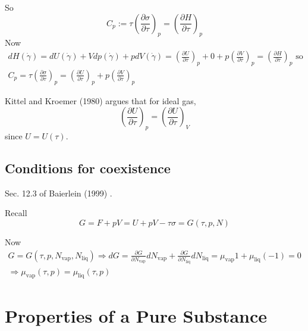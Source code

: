\documentclass[10pt]{amsart}
\begin{document}
\begin{multicols*}{2}
So 
\[
C_p := \tau \left( \frac{ \partial \sigma }{ \partial \tau } \right)_p = \left( \frac{ \partial H}{ \partial \tau} \right)_p
\]
Now 
\[
\begin{gathered}
  dH(\dot{\gamma}) = dU(\dot{\gamma}) + Vdp(\dot{\gamma} ) + pdV(\dot{\gamma}) = \left( \frac{ \partial U }{ \partial \tau} \right)_p + 0 + p \left( \frac{ \partial V}{ \partial \tau} \right)_p = \left( \frac{ \partial H }{ \partial \tau } \right)_p \text{ so } \\ 
  C_p = \tau \left( \frac{ \partial \sigma }{ \partial \tau} \right)_p = \left( \frac{ \partial U}{ \partial \tau} \right)_p + p\left( \frac{ \partial V}{ \partial \tau} \right)_p 
\end{gathered}
\]

Kittel and Kroemer (1980) \cite{CKittelHKroemer1980} argues that for ideal gas, 
\[
\left( \frac{ \partial U}{ \partial \tau} \right)_p = \left( \frac{ \partial U}{ \partial \tau} \right)_V
\]
since $U = U(\tau)$.  

\subsection{Conditions for coexistence} Sec. 12.3 of Baierlein (1999) \cite{RBaierlein1999}.  

Recall 
\[
G = F + pV = U + pV - \tau \sigma =G(\tau,p,N)
\]

Now 
\[
\begin{gathered}
  G = G(\tau, p, N_{\text{vap}}, N_{\text{liq}} )
\Longrightarrow dG = \frac{ \partial G}{ \partial N_{\text{vap}}} dN_{\text{vap}} + \frac{ \partial G}{ \partial N_{\text{liq}} } dN_{\text{liq}} = \mu_{\text{vap}} 1 + \mu_{\text{liq}} (-1) = 0  \\
\Longrightarrow \mu_{\text{vap}}(\tau,p) = \mu_{\text{liq}}(\tau,p)
\end{gathered}
\]



\cite{CBorgnakkeRSonntag2012}


\section{Properties of a Pure Substance}


\end{multicols*}
\end{document}
